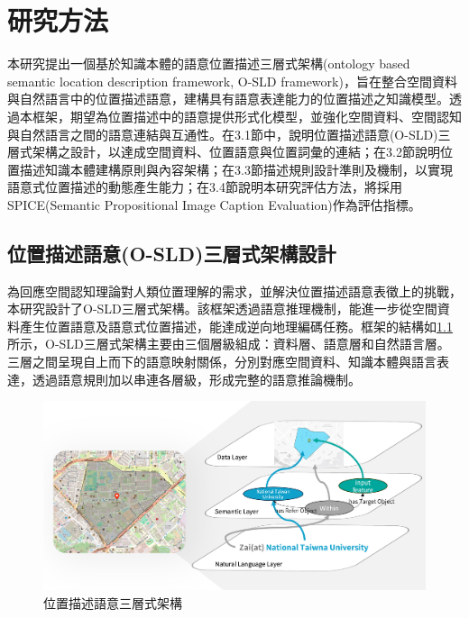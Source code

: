 
\chapter{研究方法}

本研究提出一個基於知識本體的語意位置描述三層式架構(ontology based semantic location description framework, O-SLD framework)，旨在整合空間資料與自然語言中的位置描述語意，建構具有語意表達能力的位置描述之知識模型。透過本框架，期望為位置描述中的語意提供形式化模型，並強化空間資料、空間認知與自然語言之間的語意連結與互通性。在3.1節中，說明位置描述語意(O-SLD)三層式架構之設計，以達成空間資料、位置語意與位置詞彙的連結；在3.2節說明位置描述知識本體建構原則與內容架構；在3.3節描述規則設計準則及機制，以實現語意式位置描述的動態產生能力；在3.4節說明本研究評估方法，將採用SPICE(Semantic Propositional Image Caption Evaluation)作為評估指標。

\section{位置描述語意(O-SLD)三層式架構設計}

為回應空間認知理論對人類位置理解的需求，並解決位置描述語意表徵上的挑戰，本研究設計了O-SLD三層式架構。該框架透過語意推理機制，能進一步從空間資料產生位置語意及語意式位置描述，能達成逆向地理編碼任務。框架的結構如\ref{fig:three-layered}所示，O-SLD三層式架構主要由三個層級組成：資料層、語意層和自然語言層。三層之間呈現自上而下的語意映射關係，分別對應空間資料、知識本體與語言表達，透過語意規則加以串連各層級，形成完整的語意推論機制。

\begin{figure}[!htbp]
\centering
\includegraphics[width = \textwidth]{figures/three-layered.png}
\caption{位置描述語意三層式架構}
\label{fig:three-layered}
\end{figure}

